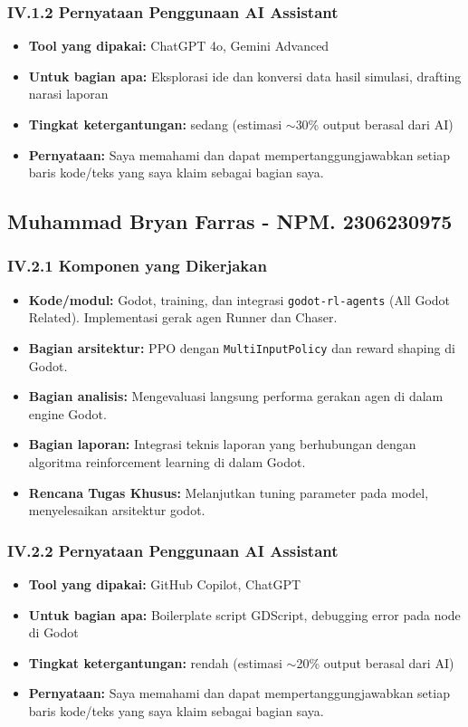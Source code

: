 \documentclass[12pt,a4paper]{article}
\begin{document}
\subsubsection*{IV.1.2 Pernyataan Penggunaan AI Assistant}
\begin{itemize}
    \item \textbf{Tool yang dipakai:} ChatGPT 4o, Gemini Advanced
    \item \textbf{Untuk bagian apa:} Eksplorasi ide dan konversi data hasil simulasi, drafting narasi laporan
    \item \textbf{Tingkat ketergantungan:} sedang (estimasi $\sim$30\% output berasal dari AI)
    \item \textbf{Pernyataan:} Saya memahami dan dapat mempertanggungjawabkan setiap baris kode/teks yang saya klaim sebagai bagian saya.
\end{itemize}

\subsection{Muhammad Bryan Farras - NPM. 2306230975}

\subsubsection*{IV.2.1 Komponen yang Dikerjakan}
\begin{itemize}
    \item \textbf{Kode/modul:} Godot, training, dan integrasi \texttt{godot-rl-agents} (All Godot Related). Implementasi gerak agen Runner dan Chaser.
    \item \textbf{Bagian arsitektur:} PPO dengan \texttt{MultiInputPolicy} dan reward shaping di Godot.
    \item \textbf{Bagian analisis:} Mengevaluasi langsung performa gerakan agen di dalam engine Godot.
    \item \textbf{Bagian laporan:} Integrasi teknis laporan yang berhubungan dengan algoritma reinforcement learning di dalam Godot.
    \item \textbf{Rencana Tugas Khusus:} Melanjutkan tuning parameter pada model, menyelesaikan arsitektur godot.
\end{itemize}

\subsubsection*{IV.2.2 Pernyataan Penggunaan AI Assistant}
\begin{itemize}
    \item \textbf{Tool yang dipakai:} GitHub Copilot, ChatGPT
    \item \textbf{Untuk bagian apa:} Boilerplate script GDScript, debugging error pada node di Godot
    \item \textbf{Tingkat ketergantungan:} rendah (estimasi $\sim$20\% output berasal dari AI)
    \item \textbf{Pernyataan:} Saya memahami dan dapat mempertanggungjawabkan setiap baris kode/teks yang saya klaim sebagai bagian saya.
\end{itemize}
\end{document}
